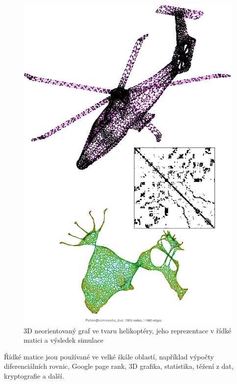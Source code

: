 \begin{figure}
	\includegraphics[width=1.0\textwidth]{./images/commanche/commanche}
	\caption{3D neorientovaný graf ve tvaru helikoptéry, jeho reprezentace v řídké matici a výsledek simulace}
	\label{fig:commanche}
\end{figure}

Řídké matice jsou používané ve velké škále oblastí, například výpočty diferenciálních rovnic, Google page rank, 3D grafika, statistika, těžení z dat, kryptografie a další.

